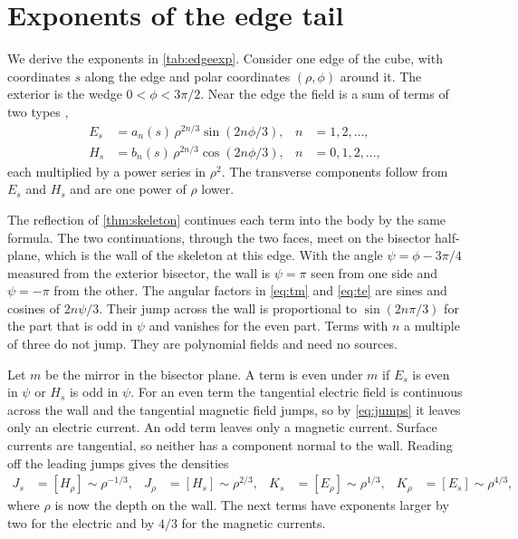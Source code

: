 \section{Exponents of the edge tail}
\label{app:edge}

We derive the exponents in \autoref{tab:edgeexp}. Consider one edge of the cube, with coordinates $s$ along the edge and polar coordinates $(\rho,\phi)$ around it. The exterior is the wedge $0<\phi<3\pi/2$. Near the edge the field is a sum of terms of two types \cite{meixner1972},
\begin{align}
  E_s &= a_n(s)\,\rho^{2n/3}\sin(2n\phi/3), & n &= 1,2,\dots, \label{eq:tm}\\
  H_s &= b_n(s)\,\rho^{2n/3}\cos(2n\phi/3), & n &= 0,1,2,\dots, \label{eq:te}
\end{align}
each multiplied by a power series in $\rho^2$. The transverse components follow from $E_s$ and $H_s$ and are one power of $\rho$ lower.

The reflection of \autoref{thm:skeleton} continues each term into the body by the same formula. The two continuations, through the two faces, meet on the bisector half-plane, which is the wall of the skeleton at this edge. With the angle $\psi = \phi - 3\pi/4$ measured from the exterior bisector, the wall is $\psi = \pi$ seen from one side and $\psi = -\pi$ from the other. The angular factors in \eqref{eq:tm} and \eqref{eq:te} are sines and cosines of $2n\psi/3$. Their jump across the wall is proportional to $\sin(2n\pi/3)$ for the part that is odd in $\psi$ and vanishes for the even part. Terms with $n$ a multiple of three do not jump. They are polynomial fields and need no sources.

Let $m$ be the mirror in the bisector plane. A term is even under $m$ if $E_s$ is even in $\psi$ or $H_s$ is odd in $\psi$. For an even term the tangential electric field is continuous across the wall and the tangential magnetic field jumps, so by \eqref{eq:jumps} it leaves only an electric current. An odd term leaves only a magnetic current. Surface currents are tangential, so neither has a component normal to the wall. Reading off the leading jumps gives the densities
\begin{align*}
  J_s &= [H_\rho] \sim \rho^{-1/3}, & J_\rho &= [H_s] \sim \rho^{2/3}, &
  K_s &= [E_\rho] \sim \rho^{1/3},  & K_\rho &= [E_s] \sim \rho^{4/3},
\end{align*}
where $\rho$ is now the depth on the wall. The next terms have exponents larger by two for the electric and by $4/3$ for the magnetic currents.


